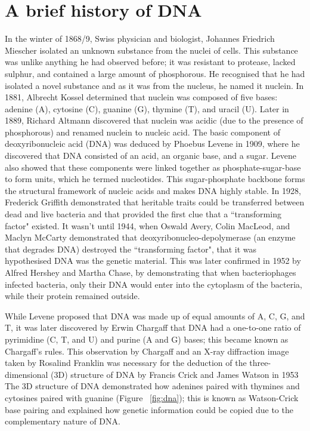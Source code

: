 \section{A brief history of DNA}

In the winter of 1868/9, Swiss physician and biologist, Johannes Friedrich Miescher isolated an unknown substance from the nuclei of cells\cite{dahm2008discovering}. This substance was unlike anything he had observed before; it was resistant to protease, lacked sulphur, and contained a large amount of phosphorous. He recognised that he had isolated a novel substance and as it was from the nucleus, he named it nuclein. In 1881, Albrecht Kossel determined that nuclein was composed of five bases: adenine (A), cytosine (C), guanine (G), thymine (T), and uracil (U). Later in 1889, Richard Altmann discovered that nuclein was acidic (due to the presence of phosphorous) and renamed nuclein to nucleic acid. The basic component of deoxyribonucleic acid (DNA) was deduced by Phoebus Levene in 1909, where he discovered that DNA consisted of an acid, an organic base, and a sugar. Levene also showed that these components were linked together as phosphate-sugar-base to form units, which he termed nucleotides. This sugar-phosphate backbone forms the structural framework of nucleic acids and makes DNA highly stable. In 1928, Frederick Griffith demonstrated that heritable traits could be transferred between dead and live bacteria and that provided the first clue that a ``transforming factor" existed\cite{griffith1928significance}. It wasn't until 1944, when Oswald Avery, Colin MacLeod, and Maclyn McCarty demonstrated that deoxyribonucleo-depolymerase (an enzyme that degrades DNA) destroyed the ``transforming factor", that it was hypothesised DNA was the genetic material\cite{avery1944studies}. This was later confirmed in 1952 by Alfred Hershey and Martha Chase, by demonstrating that when bacteriophages infected bacteria, only their DNA would enter into the cytoplasm of the bacteria, while their protein remained outside\cite{hershey1952independent}.

While Levene proposed that DNA was made up of equal amounts of A, C, G, and T, it was later discovered by Erwin Chargaff that DNA had a one-to-one ratio of pyrimidine (C, T, and U) and purine (A and G) bases\cite{pmid14938364, pmid14945441}; this became known as Chargaff's rules. This observation by Chargaff and an X-ray diffraction image taken by Rosalind Franklin was necessary for the deduction of the three-dimensional (3D) structure of DNA by Francis Crick and James Watson in 1953\cite{WATSON_1953} The 3D structure of DNA demonstrated how adenines paired with thymines and cytosines paired with guanine (Figure ~\ref{fig:dna}); this is known as Watson-Crick base pairing and explained how genetic information could be copied due to the complementary nature of DNA.

